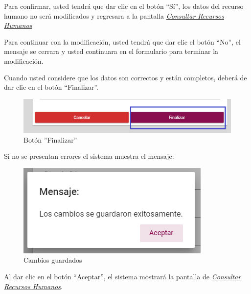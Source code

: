                 Para confirmar, usted tendrá que dar clic en el botón “Sí”, los datos del recurso humano no será modificados  y regresara a la pantalla \hyperlink{consultarRH}{\textit{Consultar Recursos Humanos}}

                Para continuar con la modificación, usted tendrá que  dar clic el botón “No”, el mensaje se cerrara y usted continuara en el formulario para terminar la modificación.

                Cuando usted considere que los datos son correctos y están completos, deberá de dar clic en el botón “Finalizar”.
                \begin{figure}[H]
                    \centering
                    \hypertarget{btnfin}{\includegraphics[width=0.7\linewidth]{images/SP1/BtnFinalizar}}
                    \caption{Botón ''Finalizar''}
                    \label{btnfin}
                \end{figure}

                Si no se presentan errores el sistema muestra el mensaje:

                 \begin{figure}[H]
                    \centering
                    \includegraphics[width=0.4\linewidth]{images/SP1/MSG31}
                    \caption{Cambios guardados}
                    \label{mensaje31}

                \end{figure}

                Al dar clic en el botón “Aceptar”, el sistema mostrará la pantalla de \hyperlink{consultarRH}{\textit{Consultar Recursos Humanos}}.

